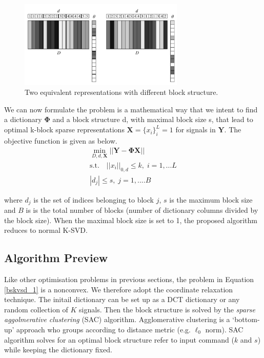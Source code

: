 \begin{figure}[!htbp]
\centering
\includegraphics[width=0.7\textwidth]{images/block_dict_compare.png}
\caption{Two equivalent representations with different block structure.}
\label{block_dict_compare}
\end{figure}

We can now formulate the problem is a mathematical way that we intent to find a dictionary $\mathbf{\Phi}$ and a block structure d, with maximal block size s, that lead to optimal k-block sparse representations $\mathbf{X} = \{x_i\}^L_i=1 $ for signals in $\mathbf{Y}$. The objective function is given as below.\\
\begin{equation}
\begin{aligned} 
    \min_{D,d,\mathbf{X}} ||\mathbf{Y} -\mathbf{\Phi}\mathbf{X}||\\
    \text{s.t.} \quad ||x_i||_{0,d} \leq k, \; i = 1,...L\\
    |d_j| \leq s, \; j = 1,....B
    \label{bskvsd_1}
\end{aligned}
\end{equation}

where $d_j$ is the set of indices belonging to block $j$, $s$ is the maximum block size and $B$ is
is the total number of blocks (number of dictionary columns divided by the block size). When the maximal block size is set to 1, the proposed algorithm reduces to normal K-SVD.\\


\subsection{Algorithm Preview}
Like other optimisation problems in previous sections, the problem in Equation \ref{bskvsd_1} is a nonconvex. We therefore adopt the coordinate relaxation technique. The initail dictionary can be set up as a DCT dictionary or any random collection of $K$ signals. Then the block structure is solved by the \textit{sparse aggolmerative clustering} (SAC) algorithm\cite{Johnson1967}. Agglomerative clustering is a `bottom-up' approach who groups according to distance metric (e.g. $\ell_0$ norm). SAC algorithm solves for an optimal block structure refer to input command ($k$ and $s$) while keeping the dictionary fixed.

